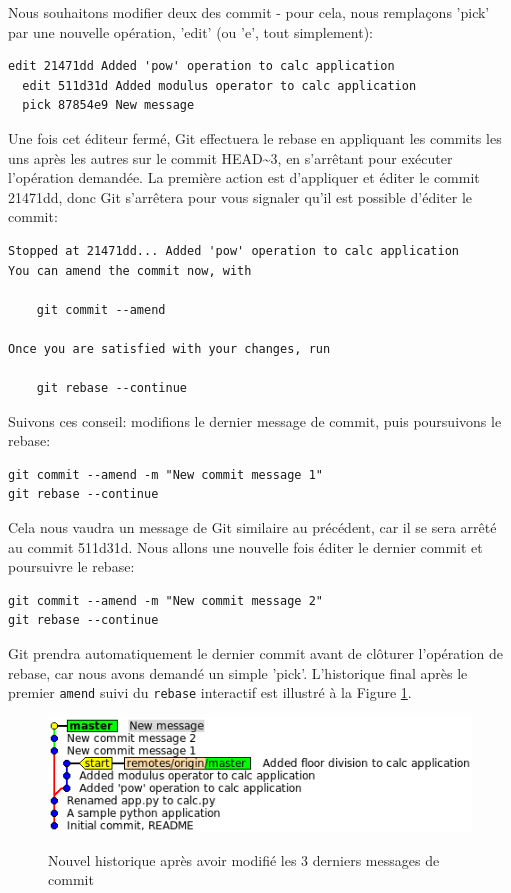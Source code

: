 \documentclass{../../common/tufte-latex/tufte-handout}
\begin{document}
Nous souhaitons modifier deux des commit - pour cela, nous remplaçons 'pick' par une nouvelle opération, 'edit' (ou 'e', tout simplement):

\begin{lstlisting}[style=BashInputStyle]
  edit 21471dd Added 'pow' operation to calc application
  edit 511d31d Added modulus operator to calc application
  pick 87854e9 New message
\end{lstlisting}

Une fois cet éditeur fermé, Git effectuera le rebase en appliquant les commits les uns après les autres sur le commit HEAD\textasciitilde3, en s'arrêtant pour exécuter l'opération demandée.
La première action est d'appliquer et éditer le commit 21471dd, donc Git s'arrêtera pour vous signaler qu'il est possible d'éditer le commit:

\begin{lstlisting}[style=BashInputStyle]
Stopped at 21471dd... Added 'pow' operation to calc application
You can amend the commit now, with

	git commit --amend

Once you are satisfied with your changes, run

	git rebase --continue
\end{lstlisting}

Suivons ces conseil: modifions le dernier message de commit, puis poursuivons le rebase:

\begin{lstlisting}[style=BashInputStyle]
git commit --amend -m "New commit message 1"
git rebase --continue
\end{lstlisting}

Cela nous vaudra un message de Git similaire au précédent, car il se sera arrêté au commit 511d31d.
Nous allons une nouvelle fois éditer le dernier commit et poursuivre le rebase:

\begin{lstlisting}[style=BashInputStyle]
git commit --amend -m "New commit message 2"
git rebase --continue
\end{lstlisting}

Git prendra automatiquement le dernier commit avant de clôturer l'opération de rebase, car nous avons demandé un simple 'pick'.
L'historique final après le premier \texttt{amend} suivi du \texttt{rebase} interactif est illustré à la Figure \ref{fig:gitrebase-amend}.

\begin{figure}%
  \centering
  \includegraphics[width=0.75\linewidth]{gitrebase-amend.png}
  \label{fig:gitrebase-amend}
  \caption{Nouvel historique après avoir modifié les 3 derniers messages de commit}
\end{figure}
\end{document}
